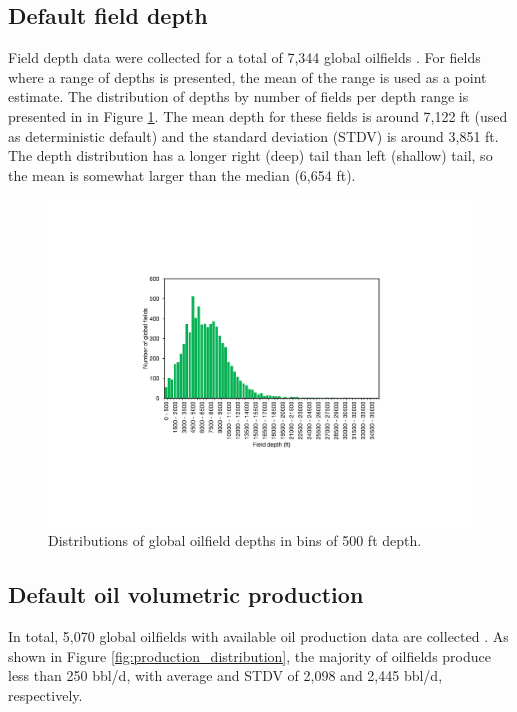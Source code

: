\documentclass[11pt]{report}
\begin{document}
\subsection{Default field depth}

Field depth data were collected for a total of 7,344 global oilfields \cite{masnadi2018global}. For fields where a range of depths is presented, the mean of the range is used as a point estimate. The distribution of depths by number of fields per depth range is presented in in Figure \ref{fig:depth_distribution}. The mean depth for these fields is around 7,122 ft (used as deterministic default) and the standard deviation (STDV) is around 3,851 ft. The depth distribution has a longer right (deep) tail than left (shallow) tail, so the mean is somewhat larger than the median (6,654 ft).

\begin{figure}[t]
\includegraphics[width=0.8\columnwidth]{images/depth_distribution.pdf}
\caption{Distributions of global oilfield depths in bins of 500 ft depth.}
\label{fig:depth_distribution}
\end{figure}

\subsection{Default oil volumetric production}

In total, 5,070 global oilfields with available oil production data are collected \cite{masnadi2018global}. As shown in Figure \ref{fig:production_distribution}, the majority of oilfields produce less than 250 bbl/d, with average and STDV of 2,098 and 2,445 bbl/d, respectively. 
\end{document}
